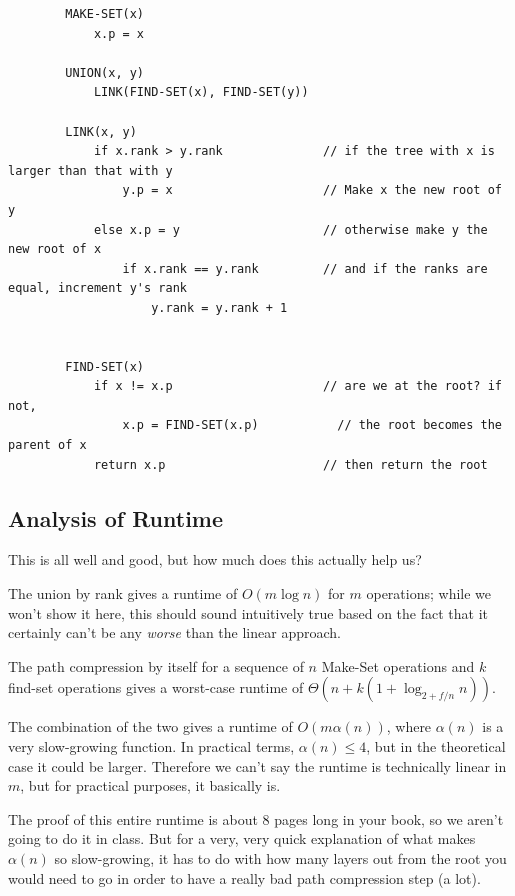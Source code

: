 \documentclass[]{article}
\begin{document}
    \begin{verbatim}
        MAKE-SET(x)
            x.p = x

        UNION(x, y)
            LINK(FIND-SET(x), FIND-SET(y))

        LINK(x, y)
            if x.rank > y.rank              // if the tree with x is larger than that with y
                y.p = x                     // Make x the new root of y
            else x.p = y                    // otherwise make y the new root of x
                if x.rank == y.rank         // and if the ranks are equal, increment y's rank
                    y.rank = y.rank + 1

        
        FIND-SET(x)
            if x != x.p                     // are we at the root? if not,
                x.p = FIND-SET(x.p)           // the root becomes the parent of x
            return x.p                      // then return the root
    \end{verbatim}


    \subsection*{Analysis of Runtime}

    This is all well and good, but how much does this actually help us?

    The union by rank gives a runtime of $O(m \log n)$ for $m$ operations; while we won't show it here, this should sound intuitively true based on the fact that it certainly can't be any \textit{worse} than the linear approach.

    The path compression by itself for a sequence of $n$ Make-Set operations and $k$ find-set operations gives a worst-case runtime of $\Theta(n + k(1 + \log_{2+f/n}n))$. 

    The combination of the two gives a runtime of $O(m\alpha(n))$, where $\alpha(n)$ is a very slow-growing function. In practical terms, $\alpha(n) \leq 4$, but in the theoretical case it could be larger. Therefore we can't say the runtime is technically linear in $m$, but for practical purposes, it basically is. 

    The proof of this entire runtime is about 8 pages long in your book, so we aren't going to do it in class. But for a very, very quick explanation of what makes $\alpha(n)$ so slow-growing, it has to do with how many layers out from the root you would need to go in order to have a really bad path compression step (a lot). 
\end{document}
